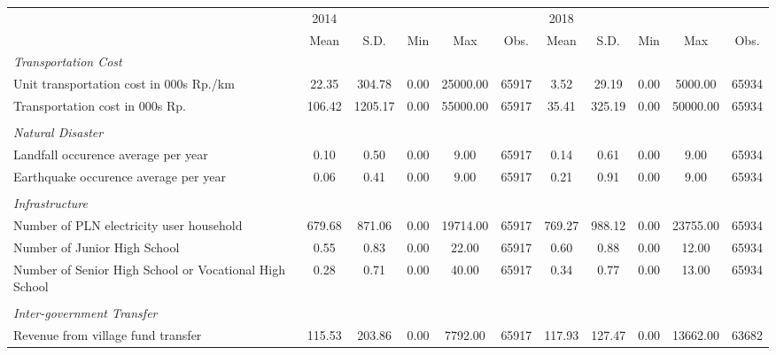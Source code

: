 \begin{tabular}{l*{2}{ccccc}}
\toprule
                &     2014&         &         &         &         &     2018&         &         &         &         \\
                &     Mean&     S.D.&      Min&      Max&     Obs.&     Mean&     S.D.&      Min&      Max&     Obs.\\
\midrule
\emph{Transportation Cost}&         &         &         &         &         &         &         &         &         &         \\
\hspace{0.25cm} Unit transportation cost in 000s Rp./km&    22.35&   304.78&     0.00& 25000.00&    65917&     3.52&    29.19&     0.00&  5000.00&    65934\\
\hspace{0.25cm} Transportation cost in 000s Rp.&   106.42&  1205.17&     0.00& 55000.00&    65917&    35.41&   325.19&     0.00& 50000.00&    65934\\
\vspace{0.05em} \\ \emph{Natural Disaster}&         &         &         &         &         &         &         &         &         &         \\
\hspace{0.25cm} Landfall occurence average per year&     0.10&     0.50&     0.00&     9.00&    65917&     0.14&     0.61&     0.00&     9.00&    65934\\
\hspace{0.25cm} Earthquake occurence average per year&     0.06&     0.41&     0.00&     9.00&    65917&     0.21&     0.91&     0.00&     9.00&    65934\\
\vspace{0.05em} \\ \emph{Infrastructure}&         &         &         &         &         &         &         &         &         &         \\
\hspace{0.25cm} Number of PLN electricity user household&   679.68&   871.06&     0.00& 19714.00&    65917&   769.27&   988.12&     0.00& 23755.00&    65934\\
\hspace{0.25cm} Number of Junior High School&     0.55&     0.83&     0.00&    22.00&    65917&     0.60&     0.88&     0.00&    12.00&    65934\\
\hspace{0.25cm} Number of Senior High School or Vocational High School&     0.28&     0.71&     0.00&    40.00&    65917&     0.34&     0.77&     0.00&    13.00&    65934\\
\vspace{0.05em} \\ \emph{Inter-government Transfer}&         &         &         &         &         &         &         &         &         &         \\
\hspace{0.25cm} Revenue from village fund transfer&   115.53&   203.86&     0.00&  7792.00&    65917&   117.93&   127.47&     0.00& 13662.00&    63682\\
\bottomrule
\end{tabular}
